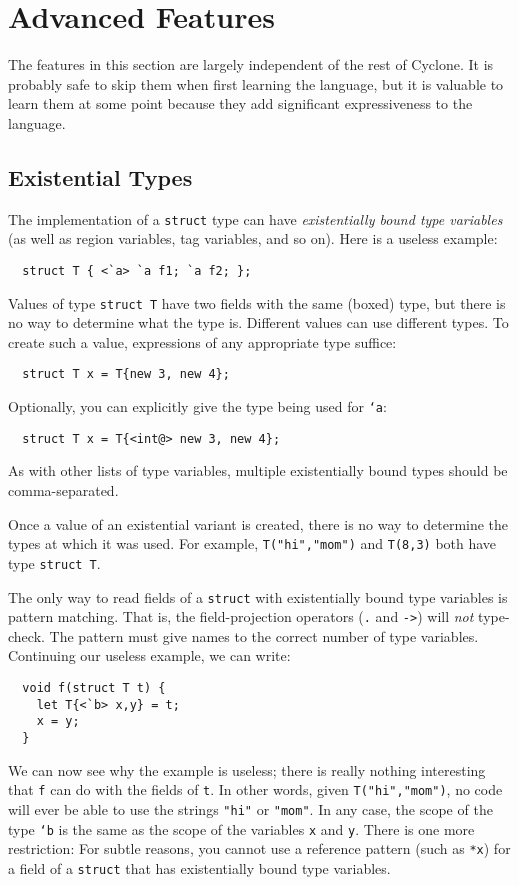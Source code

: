 \section{Advanced Features}
\label{sec:advanced}

The features in this section are largely independent of the rest of
Cyclone.  It is probably safe to skip them when first learning the
language, but it is valuable to learn them at some point because they
add significant expressiveness to the language.

\subsection{Existential Types}

The implementation of a \texttt{struct} type can have
\emph{existentially bound type variables} (as well as region
variables, tag variables, and so on).  Here is a useless example:
\begin{verbatim}
  struct T { <`a> `a f1; `a f2; };
\end{verbatim}
Values of type \texttt{struct T} have two fields with the same (boxed)
type, but there is no way to determine what the type is.  Different
values can use different types.  To create
such a value, expressions of any appropriate type suffice:
\begin{verbatim}
  struct T x = T{new 3, new 4};
\end{verbatim}
Optionally, you can explicitly give the type being used for
\texttt{`a}:
\begin{verbatim}
  struct T x = T{<int@> new 3, new 4};
\end{verbatim}
As with other lists of type variables, multiple existentially bound
types should be comma-separated.

Once a value of an existential variant is created, there is no way to
determine the types at which it was used.  For example,
\texttt{T("hi","mom")} and \texttt{T(8,3)} both have type
\texttt{struct T}.

The only way to read fields of a \texttt{struct} with existentially
bound type variables is pattern matching.  That is, the
field-projection operators (\texttt{.} and \texttt{->}) will
\emph{not} type-check.  The pattern must give names to the correct
number of type variables.
Continuing our useless example, we can write:
\begin{verbatim}
  void f(struct T t) {
    let T{<`b> x,y} = t;
    x = y;
  }
\end{verbatim}
We can now see why the example is useless; there is really nothing
interesting that \texttt{f} can do with the fields of \texttt{t}.  In
other words, given \texttt{T("hi","mom")}, no code will ever be
able to use the strings \texttt{"hi"} or \texttt{"mom"}. In any case,
the scope of the type \texttt{`b} is the same as the scope of the
variables \texttt{x} and \texttt{y}.  There is one more restriction:
For subtle reasons, you cannot use a reference pattern (such as
\texttt{*x}) for a field of a \texttt{struct} that has existentially
bound type variables.

